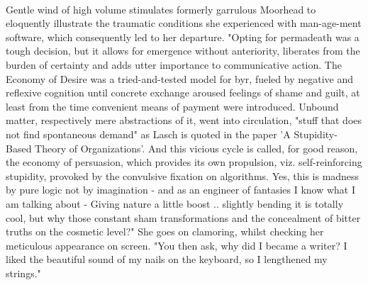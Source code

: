 \documentclass{article}
\begin{document}
\paragraph{}
Gentle wind of high volume stimulates 
formerly garrulous Moorhead to eloquently illustrate 
the traumatic conditions she experienced with man-age-ment software,
which consequently led to her departure.
"Opting for permadeath was a tough decision, 
but it allows for emergence without anteriority, 
liberates from the burden of certainty and 
adds utter importance to communicative action.
The Economy of Desire was a 
tried-and-tested model for byr, fueled by negative and 
reflexive cognition until concrete exchange 
aroused feelings of shame and guilt,  
at least from the time convenient means of payment were introduced. 
Unbound matter, respectively mere abstractions of it, went into circulation,
"stuff that does not find spontaneous demand" as Lasch is 
quoted in the paper 'A Stupidity-Based Theory of Organizations'.
And this vicious cycle is called, for good reason,
the economy of persuasion, 
which provides its own propulsion, viz. self-reinforcing stupidity,
provoked by the convulsive fixation on algorithms.
Yes, this is madness by pure logic not by imagination -
and as an engineer of fantasies I know what I am talking about -
Giving nature a little boost .. slightly bending it
is totally cool, but why those constant sham transformations and the
concealment of bitter truths on the cosmetic level?"
She goes on clamoring, whilst checking her meticulous appearance on screen.  
"You then ask, why did I became a writer? 
I liked the beautiful sound of my nails on the keyboard, 
so I lengthened my strings." 
\end{document}
